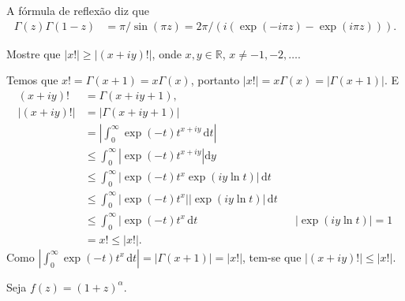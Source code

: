 \documentclass[a4paper,12pt, leqno, answers]{exam}
\begin{document}
\begin{questions}
\begin{solution}
        A f\'{o}rmula de reflex\~{a}o diz que
        \begin{align*}
            \Gamma(z) \Gamma(1 -z) &= \pi / \sin(\pi z) = 2 \pi / \left( i (\exp(-i \pi z) - \exp(i \pi z)) \right).
        \end{align*}
    \end{solution}

    \question Mostre que $|x!| \geq |\left( x + iy \right)!|$, onde $x, y \in \mathbb{R}$, $x \neq -1, -2, \ldots$.
    \begin{solution}
        Temos que $x! = \Gamma(x + 1) = x \Gamma(x)$, portanto $| x! | = x \Gamma(x) = | \Gamma(x + 1) |$. E
        \begin{align*}
            (x + i y)! &= \Gamma(x + i y + 1), \\
            | (x + i y)! | &= | \Gamma(x + i y + 1) | \\
            &= \left| \int_0^\infty \exp(-t) t^{x + iy} \,\mathrm{d}t \right| \\
            &\leq \int_0^\infty | \exp(-t) t^{x + i y} | \mathrm{d}y \\
            &\leq \int_0^\infty | \exp(-t) t^x \exp(i y \ln t) | \,\mathrm{d}t \\
            &\leq \int_0^\infty | \exp(-t) t^x | | \exp(i y \ln t) | \,\mathrm{d}t \\
            &\leq \int_0^\infty | \exp(-t) t^x \,\mathrm{d}t && | \exp(i y \ln t) | = 1 \\
            &= x! \leq | x! |.
        \end{align*}
        Como $| \int_0^\infty \exp(-t) t^x \,\mathrm{d}t | = | \Gamma(x + 1) | = | x! |$, tem-se que $ | (x + i y)! | \leq | x! |$.
    \end{solution}

    \question Seja $f(z) = \left( 1 + z \right)^\alpha$.
    \begin{parts}

\end{parts}
\end{questions}
\end{document}

